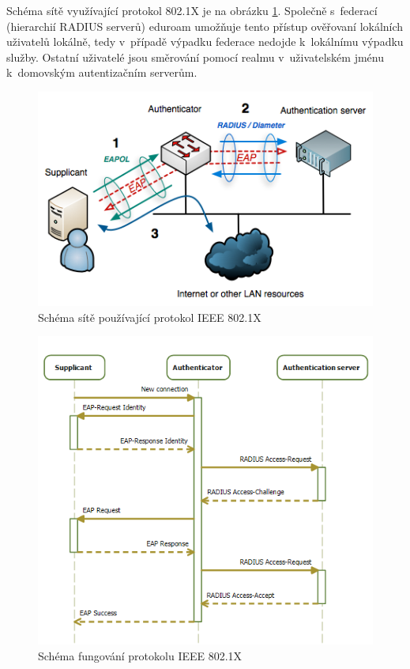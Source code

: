 \documentclass[thesis=M,czech]{FITthesis}[2012/06/26]
\begin{document}
    Schéma sítě využívající protokol 802.1X je na obrázku \ref{fig:8021x_net}.
    Společně s~federací (hierarchií RADIUS serverů) eduroam umožňuje tento přístup
    ověřovaní lokálních uživatelů lokálně, tedy v~případě výpadku federace nedojde k~lokálnímu výpadku služby.
    Ostatní uživatelé jsou směrování pomocí realmu v~uživatelském jménu k~domovským autentizačním serverům.
    \cite{eduroam_caletka_pdf}

    \begin{figure}
      \centering
        \includegraphics[scale=0.65]{8021x_net.png}
      \caption[Schéma sítě používající protokol IEEE 802.1X]{Schéma sítě používající protokol IEEE 802.1X \cite{eduroam_caletka_pdf}}
      \label{fig:8021x_net}
    \end{figure}

    \begin{figure}
      \centering
        \includegraphics[scale=0.85]{8021x.png}
      \caption[Schéma fungování protokolu IEEE 802.1X]{Schéma fungování protokolu IEEE 802.1X \cite{8021x}}
      \label{fig:8021x}
    \end{figure}
\end{document}
